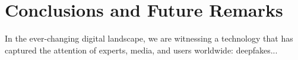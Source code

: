 \documentclass[main.tex]{subfiles}
\begin{document}
\section{Conclusions and Future Remarks}\label{sec:conclusions}
In the ever-changing digital landscape, we are witnessing a technology that has captured the attention of experts, media, and users worldwide: deepfakes...
\end{document}
